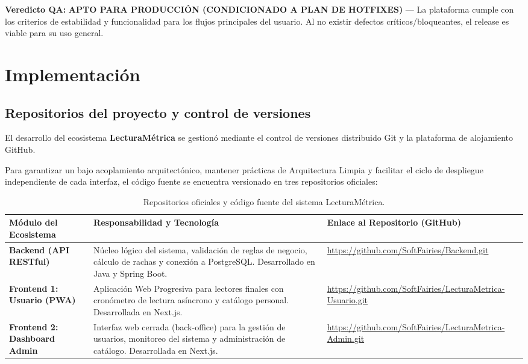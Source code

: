 \documentclass[12pt, atypical, journal]{article}
\begin{document}
\vspace{0.5em}
\noindent\textbf{Veredicto QA:} \textbf{APTO PARA PRODUCCIÓN (CONDICIONADO A PLAN DE HOTFIXES)} --- La plataforma cumple con los criterios de estabilidad y funcionalidad para los flujos principales del usuario. Al no existir defectos críticos/bloqueantes, el release es viable para su uso general.

\section{Implementación}

\subsection{Repositorios del proyecto y control de versiones}
El desarrollo del ecosistema \textbf{LecturaMétrica} se gestionó mediante el control de versiones distribuido Git y la plataforma de alojamiento GitHub. 

Para garantizar un bajo acoplamiento arquitectónico, mantener prácticas de Arquitectura Limpia y facilitar el ciclo de despliegue independiente de cada interfaz, el código fuente se encuentra versionado en tres repositorios oficiales:

\begin{table}[H]
\centering
\footnotesize
\begin{tabular}{|p{3.8cm}|p{6.2cm}|p{4.5cm}|}
\hline
\textbf{Módulo del Ecosistema} & \textbf{Responsabilidad y Tecnología} & \textbf{Enlace al Repositorio (GitHub)} \\ \hline
\textbf{Backend (API RESTful)} & Núcleo lógico del sistema, validación de reglas de negocio, cálculo de rachas y conexión a PostgreSQL. Desarrollado en Java y Spring Boot. & \url{https://github.com/SoftFairies/Backend.git} \\ \hline
\textbf{Frontend 1: Usuario (PWA)} & Aplicación Web Progresiva para lectores finales con cronómetro de lectura asíncrono y catálogo personal. Desarrollada en Next.js. & \url{https://github.com/SoftFairies/LecturaMetrica-Usuario.git} \\ \hline
\textbf{Frontend 2: Dashboard Admin} & Interfaz web cerrada (back-office) para la gestión de usuarios, monitoreo del sistema y administración de catálogo. Desarrollada en Next.js. & \url{https://github.com/SoftFairies/LecturaMetrica-Admin.git} \\ \hline
\end{tabular}
\caption{Repositorios oficiales y código fuente del sistema LecturaMétrica.}
\label{tab:repositorios_github}
\end{table}
\end{document}
